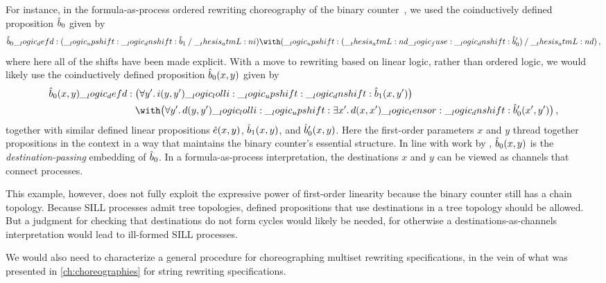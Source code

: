 
For instance, in the formula-as-process ordered rewriting choreography of the binary counter~, we used the coinductively defined proposition $\hat{b}_0$ given by 
\begin{equation*}
  \defp{b}_0 \defd (\up \dn \defp{b}_1 \pmir \atmL{i}) \with (\up (\atmL{d} \fuse \dn \defp{b}'_0) \pmir \atmL{d})
  \,,
\end{equation*}
where here all of the shifts have been made explicit.
With a move to rewriting based on linear logic, rather than ordered logic, we would likely use the coinductively defined proposition $\hat{b}_0(x, y)$ given by
\begin{equation*}
  \defp{b}_0(x, y) \defd
    \begin{lgathered}[t]
      \bigl(\forall y'.\, i(y, y') \lolli \up \dn \defp{b}_1(x, y')\bigr) \\
      {} \with \bigl(\forall y'.\, d(y, y') \lolli \up \exists x'.\, d(x, x') \tensor \dn \defp{b}'_0(x', y')\bigr)
    \,,
    \end{lgathered}
\end{equation*}
together with similar defined linear propositions $\hat{e}(x, y)$, $\hat{b}_1(x, y)$, and $\hat{b}'_0(x, y)$.
Here the first-order parameters $x$ and $y$ thread together propositions in the context in a way that maintains the binary counter's essential structure.
In line with work by \textcite{Simmons+Pfenning:HOSC11}, $\hat{b}_0(x, y)$ is the \emph{destination-passing} embedding of $\hat{b}_0$.
In a formula-as-process interpretation, the destinations $x$ and $y$ can be viewed as channels that connect processes.

This example, however, does not fully exploit the expressive power of first-order linearity because the binary counter still has a chain topology.
Because \ac{SILL} processes admit tree topologies, defined propositions that use destinations in a tree topology should be allowed.
But a judgment for checking that destinations do not form cycles would likely be needed, for otherwise a destinations-as-channels interpretation would lead to ill-formed \ac{SILL} processes.

We would also need to characterize a general procedure for choreographing multiset rewriting specifications, in the vein of what was presented in \cref{ch:choreographies} for string rewriting specifications.



